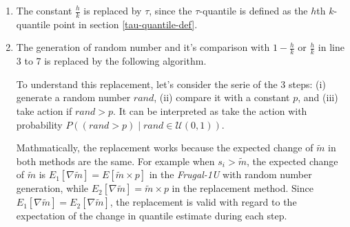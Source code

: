 \documentclass[11pt]{article}
\begin{document}
\begin{enumerate}
    \item The constant $\frac{h}{k}$ is replaced by $\tau$, since the $\tau$-quantile is defined
     as the $h$th $k$-quantile point in section \ref{tau-quantile-def}.
    \item The generation of random number and it's comparison with $1-\frac{h}{k}$ or $\frac{h}{k}$
    in line 3 to 7 is replaced by the following algorithm.
    \begin{algorithm}
        \begin{algorithmic}[1]
            \setcounter{ALG@line}{2}
            \State{ }   
            \EndIf 
        \end{algorithmic}
    \end{algorithm}

    
    To understand this replacement, let's consider the serie of the 3 steps: 
    (i) generate a random number $rand$, 
    (ii) compare it with a constant $p$, and
    (iii) take action if $rand > p$. 
    It can be interpreted as take the action with probability 
    $P((rand > p) \mid rand \in \mathcal{U}(0,1))$. 

    Mathmatically, the replacement works because the expected change of
    $\tilde{m}$ in both methods are the same. 
    For example when $s_i > \tilde{m}$, 
    the expected change of $\tilde{m}$ is
    $E_1[\nabla \tilde{m}] = E[\tilde{m} \times p]$ in the \textit{Frugal-1U} with 
    random number generation,
    while 
    $E_2[\nabla \tilde{m}] = \tilde{m} \times p$ in the replacement method.
    Since $E_1[\nabla \tilde{m}] = E_2[\nabla \tilde{m}]$, the replacement is valid
    with regard to the expectation of the change in quantile estimate during each step.

\end{enumerate}
\end{document}
